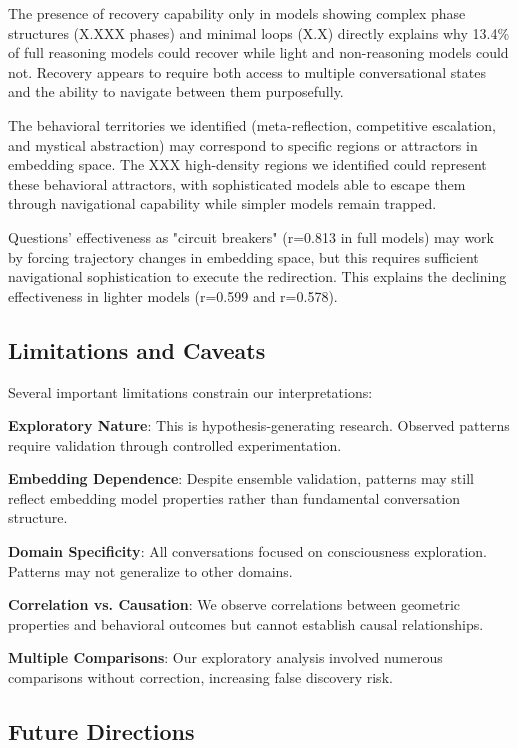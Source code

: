 \documentclass[11pt,letterpaper]{article}
\newcommand{\fullReasoningRecovery}{13.4\%}
\newcommand{\fullQuestionR}{0.813}
\newcommand{\lightQuestionR}{0.599}
\newcommand{\nonQuestionR}{0.578}
\newcommand{\fullPhaseCount}{X.XXX}
\newcommand{\fullLoops}{X.X}
\newcommand{\highDensityRegions}{XXX}
\begin{document}
The presence of recovery capability only in models showing complex phase structures (\fullPhaseCount{} phases) and minimal loops (\fullLoops{}) directly explains why \fullReasoningRecovery{} of full reasoning models could recover while light and non-reasoning models could not. Recovery appears to require both access to multiple conversational states and the ability to navigate between them purposefully.

The behavioral territories we identified (meta-reflection, competitive escalation, and mystical abstraction) may correspond to specific regions or attractors in embedding space. The \highDensityRegions{} high-density regions we identified could represent these behavioral attractors, with sophisticated models able to escape them through navigational capability while simpler models remain trapped.

Questions' effectiveness as "circuit breakers" (r=\fullQuestionR{} in full models) may work by forcing trajectory changes in embedding space, but this requires sufficient navigational sophistication to execute the redirection. This explains the declining effectiveness in lighter models (r=\lightQuestionR{} and r=\nonQuestionR{}).

\subsection{Limitations and Caveats}

Several important limitations constrain our interpretations:

\textbf{Exploratory Nature}: This is hypothesis-generating research. Observed patterns require validation through controlled experimentation.

\textbf{Embedding Dependence}: Despite ensemble validation, patterns may still reflect embedding model properties rather than fundamental conversation structure.

\textbf{Domain Specificity}: All conversations focused on consciousness exploration. Patterns may not generalize to other domains.

\textbf{Correlation vs. Causation}: We observe correlations between geometric properties and behavioral outcomes but cannot establish causal relationships.

\textbf{Multiple Comparisons}: Our exploratory analysis involved numerous comparisons without correction, increasing false discovery risk.

\subsection{Future Directions}
\end{document}
